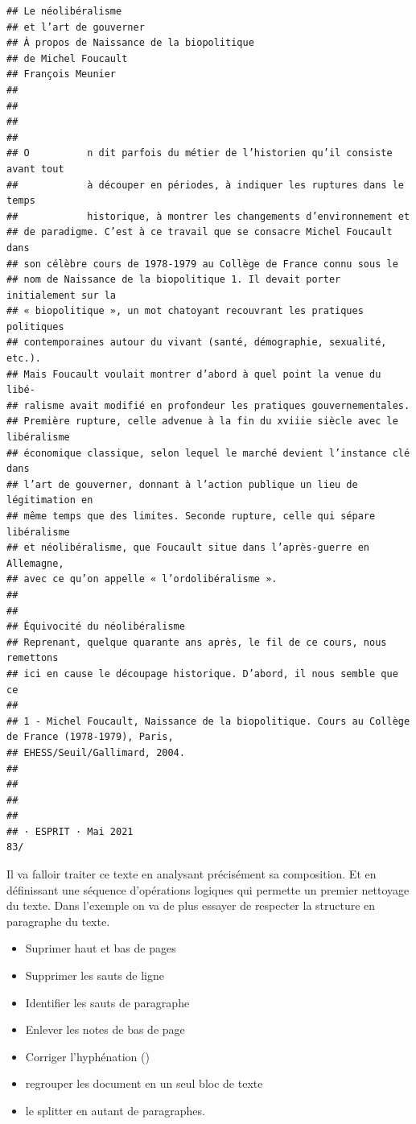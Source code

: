 \documentclass[
]{book}
\providecommand{\tightlist}{%
  \setlength{\itemsep}{0pt}\setlength{\parskip}{0pt}}
\begin{document}
\begin{verbatim}
## Le néolibéralisme
## et l’art de gouverner
## À propos de Naissance de la biopolitique
## de Michel Foucault
## François Meunier
## 
## 
## 
## 
## O          n dit parfois du métier de l’historien qu’il consiste avant tout
##            à découper en périodes, à indiquer les ruptures dans le temps
##            historique, à montrer les changements d’environnement et
## de paradigme. C’est à ce travail que se consacre Michel Foucault dans
## son célèbre cours de 1978-1979 au Collège de France connu sous le
## nom de Naissance de la biopolitique 1. Il devait porter initialement sur la
## « biopolitique », un mot chatoyant recouvrant les pratiques politiques
## contemporaines autour du vivant (santé, démographie, sexualité, etc.).
## Mais Foucault voulait montrer d’abord à quel point la venue du libé-
## ralisme avait modifié en profondeur les pratiques gouvernementales.
## Première rupture, celle advenue à la fin du xviiie siècle avec le libéralisme
## économique classique, selon lequel le marché devient l’instance clé dans
## l’art de gouverner, donnant à l’action publique un lieu de légitimation en
## même temps que des limites. Seconde rupture, celle qui sépare libéralisme
## et néolibéralisme, que Foucault situe dans l’après-guerre en Allemagne,
## avec ce qu’on appelle « l’ordolibéralisme ».
## 
## 
## Équivocité du néolibéralisme
## Reprenant, quelque quarante ans après, le fil de ce cours, nous remettons
## ici en cause le découpage historique. D’abord, il nous semble que ce
## 
## 1 - Michel Foucault, Naissance de la biopolitique. Cours au Collège de France (1978-1979), Paris,
## EHESS/Seuil/Gallimard, 2004.
## 
## 
## 
## 
## · ESPRIT · Mai 2021                                                                                 83/
\end{verbatim}

Il va falloir traiter ce texte en analysant précisément sa composition. Et en définissant une séquence d'opérations logiques qui permette un premier nettoyage du texte. Dans l'exemple on va de plus essayer de respecter la structure en paragraphe du texte.

\begin{itemize}
\tightlist
\item
  Suprimer haut et bas de pages
\item
  Supprimer les sauts de ligne
\item
  Identifier les sauts de paragraphe
\item
  Enlever les notes de bas de page
\item
  Corriger l'hyphénation ()
\item
  regrouper les document en un seul bloc de texte
\item
  le splitter en autant de paragraphes.
\end{itemize}
\end{document}
